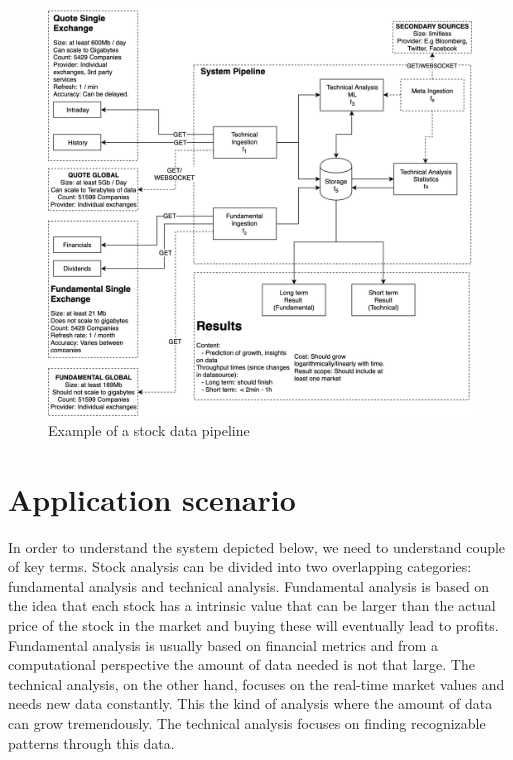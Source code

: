 
\begin{figure}[ht]
    \includegraphics[scale=0.26]{images/system2} 
    \centering
    \caption{Example of a stock data pipeline}
\end{figure}

\section{Application scenario}

In order to understand the system depicted below, we need to understand couple of key terms.
Stock analysis can be divided into two overlapping categories: fundamental analysis and technical analysis.
Fundamental analysis is based on the idea that each stock has a intrinsic value that can be larger than the actual price of the stock in the market and buying these will eventually lead to profits.\cite{sohnke}
Fundamental analysis is usually based on financial metrics and from a computational perspective the amount of data needed is not that large.
The technical analysis, on the other hand, focuses on the real-time market values and needs new data constantly.
This the kind of analysis where the amount of data can grow tremendously.
The technical analysis focuses on finding recognizable patterns through this data. \cite{murphy}


